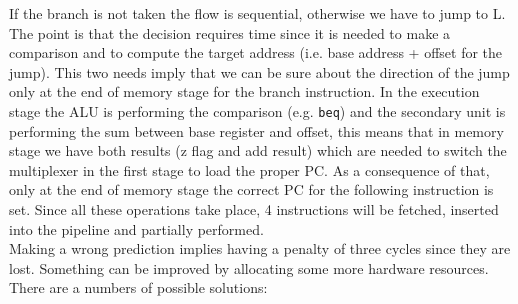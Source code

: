 If the branch is not taken the flow is sequential, otherwise we have to jump to
L. The point is that the decision requires time since it is needed to make a
comparison and to compute the target address (i.e. base address + offset for the
jump). This two needs imply that we can be sure about the direction of the jump
only at the end of memory stage for the branch instruction. In the execution
stage the ALU is performing the comparison (e.g. \verb|beq|) and the secondary
unit is performing the sum between base register and offset, this means that in
memory stage we have both results (z flag and add result) which are needed to
switch the multiplexer in the first stage to load the proper PC. As a
consequence of that, only at the end of memory stage the correct PC for the
following instruction is set. Since all these operations take place, 4
instructions will be fetched, inserted into the pipeline and partially
performed.\\
Making a wrong prediction implies having a penalty of three cycles since they
are lost. Something can be improved by allocating some more hardware resources.
There are a numbers of possible solutions:

